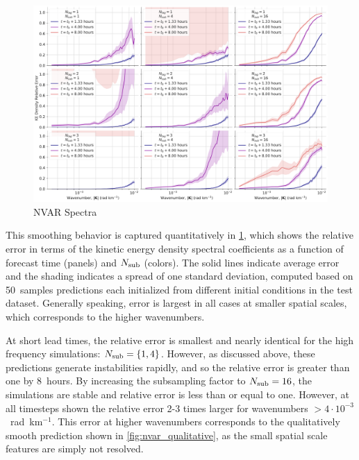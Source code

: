 \begin{figure}
    \centering
    \includegraphics[width=\textwidth]{../figures/nvar_big_ke_relerr.pdf}
    \caption{NVAR Spectra}
    \label{fig:nvar_spectra}
\end{figure}

This smoothing behavior is captured quantitatively in \cref{fig:nvar_spectra},
which shows the relative error in terms of the kinetic energy density spectral
coefficients as a function of forecast time (panels) and $N_\text{sub}$ (colors).
The solid lines indicate average error and the shading indicates a spread of one
standard deviation, computed based on 50~samples predictions each initialized
from different initial conditions in the test dataset.
Generally speaking, error is largest in all cases at smaller spatial scales,
which corresponds to the higher wavenumbers.

At short lead times, the relative error is smallest and nearly
identical for the high frequency simulations: $N_\text{sub}=\{1,4\}$.
However, as discussed above,
these predictions generate instabilities rapidly, and so the relative error is
greater than one by 8~hours.
By increasing the subsampling factor to $N_\text{sub}=16$, the simulations are stable
and relative error is less than or equal to one.
However, at all timesteps shown the relative error 2-3 times larger for wavenumbers
$> 4\cdot10^{-3}$~rad~km$^{-1}$.
This error at higher wavenumbers corresponds to the qualitatively smooth
prediction shown in \cref{fig:nvar_qualitative}, as the small spatial scale
features are simply not resolved.


